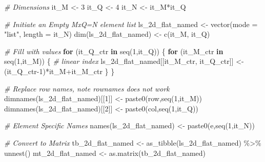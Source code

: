 \documentclass[
]{book}
\newenvironment{Shaded}{\begin{snugshade}}{\end{snugshade}}
\newcommand{\AttributeTok}[1]{\textcolor[rgb]{0.77,0.63,0.00}{#1}}
\newcommand{\CommentTok}[1]{\textcolor[rgb]{0.56,0.35,0.01}{\textit{#1}}}
\newcommand{\ControlFlowTok}[1]{\textcolor[rgb]{0.13,0.29,0.53}{\textbf{#1}}}
\newcommand{\DecValTok}[1]{\textcolor[rgb]{0.00,0.00,0.81}{#1}}
\newcommand{\FunctionTok}[1]{\textcolor[rgb]{0.00,0.00,0.00}{#1}}
\newcommand{\NormalTok}[1]{#1}
\newcommand{\OtherTok}[1]{\textcolor[rgb]{0.56,0.35,0.01}{#1}}
\newcommand{\SpecialCharTok}[1]{\textcolor[rgb]{0.00,0.00,0.00}{#1}}
\newcommand{\StringTok}[1]{\textcolor[rgb]{0.31,0.60,0.02}{#1}}
\begin{document}
\begin{Shaded}
\begin{Highlighting}[]
\CommentTok{\# Dimensions}
\NormalTok{it\_M }\OtherTok{\textless{}{-}} \DecValTok{3}
\NormalTok{it\_Q }\OtherTok{\textless{}{-}} \DecValTok{4}
\NormalTok{it\_N }\OtherTok{\textless{}{-}}\NormalTok{ it\_M}\SpecialCharTok{*}\NormalTok{it\_Q}

\CommentTok{\# Initiate an Empty MxQ=N element list}
\NormalTok{ls\_2d\_flat\_named }\OtherTok{\textless{}{-}} \FunctionTok{vector}\NormalTok{(}\AttributeTok{mode =} \StringTok{"list"}\NormalTok{, }\AttributeTok{length =}\NormalTok{ it\_N)}
\FunctionTok{dim}\NormalTok{(ls\_2d\_flat\_named) }\OtherTok{\textless{}{-}} \FunctionTok{c}\NormalTok{(it\_M, it\_Q)}

\CommentTok{\# Fill with values}
\ControlFlowTok{for}\NormalTok{ (it\_Q\_ctr }\ControlFlowTok{in} \FunctionTok{seq}\NormalTok{(}\DecValTok{1}\NormalTok{,it\_Q)) \{}
  \ControlFlowTok{for}\NormalTok{ (it\_M\_ctr }\ControlFlowTok{in} \FunctionTok{seq}\NormalTok{(}\DecValTok{1}\NormalTok{,it\_M)) \{}
    \CommentTok{\# linear index}
\NormalTok{    ls\_2d\_flat\_named[[it\_M\_ctr, it\_Q\_ctr]] }\OtherTok{\textless{}{-}}\NormalTok{ (it\_Q\_ctr}\DecValTok{{-}1}\NormalTok{)}\SpecialCharTok{*}\NormalTok{it\_M}\SpecialCharTok{+}\NormalTok{it\_M\_ctr}
\NormalTok{  \}}
\NormalTok{\}}

\CommentTok{\# Replace row names, note rownames does not work}
\FunctionTok{dimnames}\NormalTok{(ls\_2d\_flat\_named)[[}\DecValTok{1}\NormalTok{]] }\OtherTok{\textless{}{-}} \FunctionTok{paste0}\NormalTok{(}\StringTok{\textquotesingle{}row\textquotesingle{}}\NormalTok{,}\FunctionTok{seq}\NormalTok{(}\DecValTok{1}\NormalTok{,it\_M))}
\FunctionTok{dimnames}\NormalTok{(ls\_2d\_flat\_named)[[}\DecValTok{2}\NormalTok{]] }\OtherTok{\textless{}{-}} \FunctionTok{paste0}\NormalTok{(}\StringTok{\textquotesingle{}col\textquotesingle{}}\NormalTok{,}\FunctionTok{seq}\NormalTok{(}\DecValTok{1}\NormalTok{,it\_Q))}

\CommentTok{\# Element Specific Names}
\FunctionTok{names}\NormalTok{(ls\_2d\_flat\_named) }\OtherTok{\textless{}{-}} \FunctionTok{paste0}\NormalTok{(}\StringTok{\textquotesingle{}e\textquotesingle{}}\NormalTok{,}\FunctionTok{seq}\NormalTok{(}\DecValTok{1}\NormalTok{,it\_N))}

\CommentTok{\# Convert to Matrix}
\NormalTok{tb\_2d\_flat\_named }\OtherTok{\textless{}{-}} \FunctionTok{as\_tibble}\NormalTok{(ls\_2d\_flat\_named) }\SpecialCharTok{\%\textgreater{}\%} \FunctionTok{unnest}\NormalTok{()}
\NormalTok{mt\_2d\_flat\_named }\OtherTok{\textless{}{-}} \FunctionTok{as.matrix}\NormalTok{(tb\_2d\_flat\_named)}
\end{Highlighting}
\end{Shaded}
\end{document}
